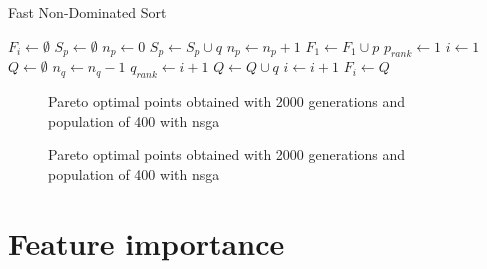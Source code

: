 \documentclass[UKenglish]{uiomasterthesis}
\begin{document}
\begin{algorithm}
\caption{Fast Non-Dominated Sort}
\label{alg:fnds}
\begin{algorithmic}
    \State $F_i \gets \emptyset$
    \State $S_p \gets \emptyset$
    \State $n_p \gets 0$
                \State $S_p \gets S_p \cup q$
                \State $n_p \gets n_p + 1$
            \EndIf
        \EndFor
            \State $F_1 \gets F_1 \cup p$
            \State $p_{rank} \gets 1$
        \EndIf
    \EndFor
    \State $i \gets 1$
        \State $Q \gets \emptyset$
                \State $n_q \gets n_q - 1$
                    \State $q_{rank} \gets i + 1$
                    \State $Q \gets Q \cup q$
                \EndIf
            \EndFor
        \EndFor
        \State $i \gets i + 1$
        \State $F_i \gets Q$
    \EndWhile
\end{algorithmic}
\end{algorithm}


\begin{figure}[!ht]
	\caption{Pareto optimal points obtained with 2000 generations and population of 400 with \ac{nsga}}
	\label{fig:pareto} 
\end{figure}

\begin{figure}[!ht]
	\caption{Pareto optimal points obtained with 2000 generations and population of 400 with \ac{nsga}}
	\label{fig:pareto_model} 
\end{figure}

\section{Feature importance}
\end{document}
